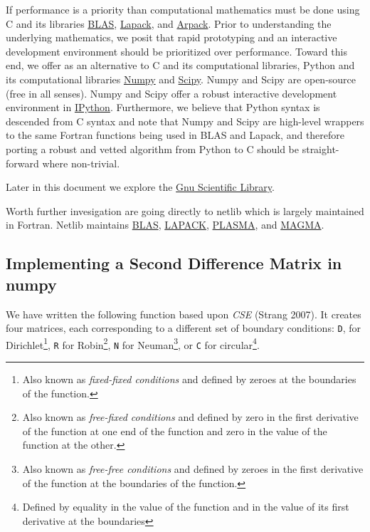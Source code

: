 \documentclass[12pt,]{book}
\begin{document}
If performance is a priority than computational mathematics must be done
using C and its libraries \href{http://www.netlib.org/blas/}{BLAS},
\href{http://www.netlib.org/lapack/}{Lapack}, and
\href{http://www.caam.rice.edu/software/ARPACK/}{Arpack}. Prior to
understanding the underlying mathematics, we posit that rapid
prototyping and an interactive development environment should be
prioritized over performance. Toward this end, we offer as an
alternative to C and its computational libraries, Python and its
computational libraries \href{http://www.numpy.org/}{Numpy} and
\href{http://www.scipy.org/}{Scipy}. Numpy and Scipy are open-source
(free in all senses). Numpy and Scipy offer a robust interactive
development environment in \href{http://ipython.org/}{IPython}.
Furthermore, we believe that Python syntax is descended from C syntax
and note that Numpy and Scipy are high-level wrappers to the same
Fortran functions being used in BLAS and Lapack, and therefore porting a
robust and vetted algorithm from Python to C should be straight-forward
where non-trivial.

Later in this document we explore the
\href{https://www.gnu.org/software/gsl/}{Gnu Scientific Library}.

Worth further invesigation are going directly to netlib which is largely
maintained in Fortran. Netlib maintains
\href{http://www.netlib.org/blas/}{BLAS},
\href{http://www.netlib.org/lapack/}{LAPACK},
\href{http://icl.cs.utk.edu/plasma/}{PLASMA}, and
\href{http://icl.cs.utk.edu/magma/}{MAGMA}.

\vfill

\pagebreak

\subsection{Implementing a Second Difference Matrix in
numpy}\label{implementing-a-second-difference-matrix-in-numpy}

We have written the following function based upon \emph{CSE} (Strang
2007). It creates four matrices, each corresponding to a different set
of boundary conditions: \texttt{D}, for
Dirichlet\footnote{Also known as \emph{fixed-fixed conditions} and defined by zeroes at the boundaries of the function.},
\texttt{R} for
Robin\footnote{Also known as \emph{free-fixed conditions} and defined by zero in the first derivative of the function at one end of the function and zero in the value of the function at the other.},
\texttt{N} for
Neuman\footnote{Also known as \emph{free-free conditions} and defined by zeroes in the first derivative of the function at the boundaries of the function.},
or \texttt{C} for
circular\footnote{Defined by equality in the value of the function and in the value of its first derivative at the boundaries}.
\end{document}
